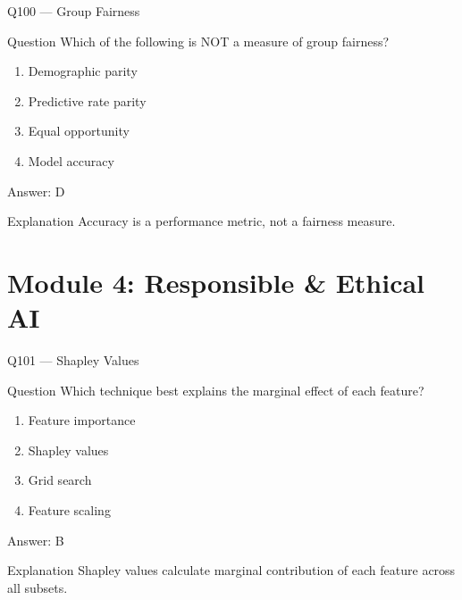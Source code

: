 \documentclass[aspectratio=169,8pt]{beamer}
\begin{document}
	\begin{frame}{Q100 --- Group Fairness}
		\begin{block}{Question}
			Which of the following is NOT a measure of group fairness?
		\end{block}
		\begin{enumerate}
			\item Demographic parity
			\item Predictive rate parity
			\item Equal opportunity
			\item Model accuracy
		\end{enumerate}
		\begin{exampleblock}{Answer: D}\end{exampleblock}
		\begin{block}{Explanation}
			Accuracy is a performance metric, not a fairness measure.
		\end{block}
	\end{frame}
	
	\section{Module 4: Responsible \& Ethical AI}
	
	\begin{frame}{Q101 --- Shapley Values}
		\begin{block}{Question}
			Which technique best explains the marginal effect of each feature?
		\end{block}
		\begin{enumerate}
			\item Feature importance
			\item Shapley values
			\item Grid search
			\item Feature scaling
		\end{enumerate}
		\begin{exampleblock}{Answer: B}\end{exampleblock}
		\begin{block}{Explanation}
			Shapley values calculate marginal contribution of each feature across all subsets.
		\end{block}
	\end{frame}
	
\end{document}
